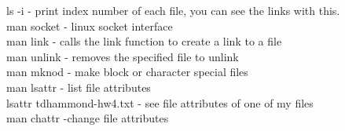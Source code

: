 \documentclass{article}
\begin{document}
ls -i - print index number of each file, you can see the links with this.\\
man socket - linux socket interface\\
man link - calls the link function to create a link to a file\\
man unlink - removes the specified file to unlink\\
man mknod - make block or character special files\\
man lsattr - list file attributes\\
lsattr tdhammond-hw4.txt - see file attributes of one of my files\\
man chattr -change file attributes\\
\end{document}

